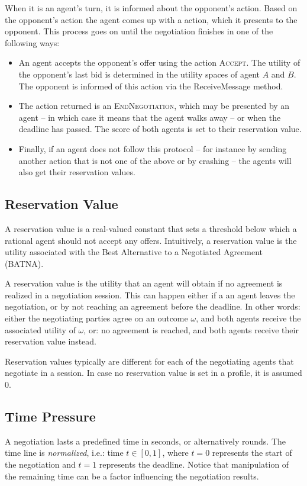 \documentclass[]{article}
\begin{document}
When it is an agent's turn, it is informed about the opponent's action. Based on the opponent's action the agent comes up with a action, which it presents to the opponent. This process goes on until the negotiation finishes in one of the following ways:
\begin{itemize}
	\item An agent accepts the opponent's offer using the action \textsc{Accept}. The utility of the opponent's last bid is determined in the utility spaces of agent $A$ and $B$. The opponent is informed of this action via the ReceiveMessage method.
	\item The action returned is an \textsc{EndNegotiation}, which may be presented by an agent -- in which case it means that the agent walks away -- or when the deadline has passed. The score of both agents is set to their reservation value.
	\item Finally, if an agent does not follow this protocol -- for instance by sending another action that is not one of the above or by crashing -- the agents will also get their reservation values.
\end{itemize}
 
\subsection{Reservation Value}
A reservation value is a real-valued constant that sets a threshold below which a rational agent should not accept any offers. Intuitively, a reservation value is the utility associated with the Best Alternative to a Negotiated Agreement (BATNA).

A reservation value is the utility that an agent will obtain if no agreement is realized in a negotiation session. This can happen either if a an agent leaves the negotiation, or by not reaching an agreement before the deadline. In other words: either the negotiating parties agree on an outcome $\omega$, and both agents receive the associated utility of $\omega$, or: no agreement is reached, and both agents receive their reservation value instead.

Reservation values typically are different for each of the negotiating agents that negotiate in a session. In case no reservation value is set in a profile, it is assumed 0.


\subsection{Time Pressure}
A negotiation lasts a predefined time in seconds, or alternatively rounds. The time line is \emph{normalized}, i.e.: time $t \in [0, 1]$, where $t = 0$ represents the start of the negotiation and $t = 1$ represents the deadline. Notice that manipulation of the remaining time can be a factor influencing the negotiation results.
\end{document}
